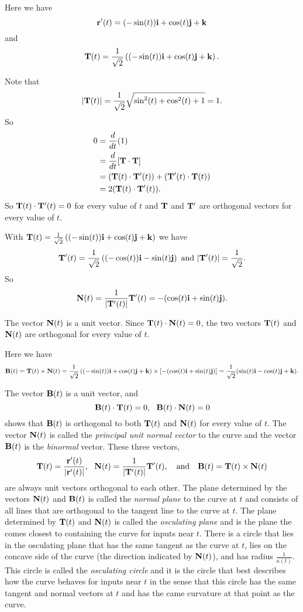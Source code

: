 \begin{exercises}
\begin{exerciseSolution}
    \ba
	    \item Here we have
\[\mathbf{r}'(t) = (-\sin(t)) \mathbf{i} + \cos(t) \mathbf{j} + \mathbf{k}\]
and
\[\mathbf{T}(t) = \frac{1}{\sqrt{2}}\left( (-\sin(t)) \mathbf{i} + \cos(t) \mathbf{j} + \mathbf{k} \right).\]
	    \item Note that 
\[\lvert \mathbf{T}(t) \rvert = \frac{1}{\sqrt{2}}\sqrt{\sin^2(t) + \cos^2(t) + 1} = 1.\]
So 
\begin{align*}
0 &= \frac{d}{dt} (1)  \\
	&= \frac{d}{dt}[\mathbf{T} \cdot \mathbf{T}] \\
	&= (\mathbf{T}(t) \cdot \mathbf{T}'(t)) + (\mathbf{T}'(t) \cdot \mathbf{T}(t)) \\
	&= 2(\mathbf{T}(t) \cdot \mathbf{T}'(t)).
\end{align*}
So $\mathbf{T}(t) \cdot \mathbf{T}'(t) = 0$ for every value of $t$ and $\mathbf{T}$ and $\mathbf{T}'$ are orthogonal vectors for every value of $t$.  
	    \item With $\mathbf{T}(t) = \frac{1}{\sqrt{2}}\left( (-\sin(t)) \mathbf{i} + \cos(t) \mathbf{j} + \mathbf{k} \right)$ we have 
\[\mathbf{T}'(t) = \frac{1}{\sqrt{2}}\left( (-\cos(t)) \mathbf{i} - \sin(t) \mathbf{j} \right) \text{ and } |\mathbf{T}'(t)| = \frac{1}{\sqrt{2}}.\]
So 
\[\mathbf{N}(t) = \frac{1}{|\mathbf{T}'(t)|} \mathbf{T}'(t) = -(\cos(t) \mathbf{i} + \sin(t) \mathbf{j}).\]
	    \item The vector $\mathbf{N}(t)$ is a unit vector. Since $\mathbf{T}(t) \cdot \mathbf{N}(t) = 0$, the two vectors $\mathbf{T}(t)$ and $\mathbf{N}(t)$ are orthogonal for every value of $t$. 
	    \item Here we have 
\[\mathbf{B}(t) = \mathbf{T}(t) \times \mathbf{N}(t) = \frac{1}{\sqrt{2}}\left( (-\sin(t)) \mathbf{i} + \cos(t) \mathbf{j} + \mathbf{k} \right) \times [-(\cos(t) \mathbf{i} + \sin(t) \mathbf{j})] = \frac{1}{\sqrt{2}} (\sin(t) \mathbf{i} - \cos(t) \mathbf{j} + \mathbf{k}).\]
	    \item The vector $\mathbf{B}(t)$ is a unit vector, and 
\[\vB(t) \cdot \vT(t) = 0, \ \ \vB(t) \cdot \vN(t) = 0\]
shows that $\mathbf{B}(t)$ is orthogonal to both $\mathbf{T}(t)$ and $\mathbf{N}(t)$ for every value of $t$. The vector $\mathbf{N}(t)$ is called the \emph{principal unit normal vector} to the curve and the vector $\mathbf{B}(t)$ is the \emph{binormal} vector. These three vectors,
\[\mathbf{T}(t) = \frac{\mathbf{r}'(t)}{\lvert \mathbf{r}'(t) \rvert}, \ \  \mathbf{N}(t) = \frac{1}{\lvert \mathbf{T}'(t) \rvert} \mathbf{T}'(t),  \ \ \text{ and } \ \ \mathbf{B}(t) = \mathbf{T}(t) \times \mathbf{N}(t)\]
are always unit vectors orthogonal to each other. The plane determined by the vectors $\mathbf{N}(t)$ and $\mathbf{B}(t)$ is called the \emph{normal plane} to the curve at $t$ and consists of all lines that are orthogonal to the tangent line to the curve at $t$. The plane determined by $\mathbf{T}(t)$ and $\mathbf{N}(t)$ is called the \emph{osculating plane} and is the plane the comes closest to containing the curve for inputs near $t$. There is a circle that lies in the osculating plane that has the same tangent as the curve at $t$, lies on the concave side of the curve (the direction indicated by $\mathbf{N}(t)$), and has radius $\frac{1}{\kappa(t)}$. This circle is called the \emph{osculating circle} and it is the circle that best describes how the curve behaves for inputs near $t$ in the sense that this circle has the same tangent and normal vectors at $t$ and has the came curvature at that point as the curve. 

\end{exerciseSolution}
\end{exercises}
